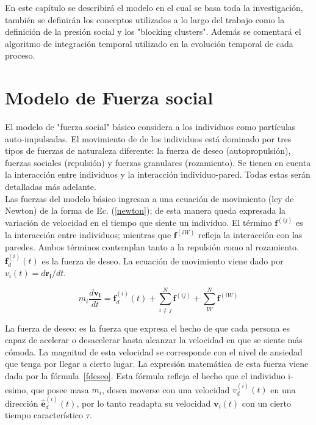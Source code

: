 \label{marco_teo}

En este capítulo se describirá el modelo en el cual se basa toda la investigación, también se definirán los conceptos utilizados a lo largo del trabajo como la definición de la presión social y los "blocking clusters". Además se comentará el algoritmo de integración temporal utilizado en la evolución temporal de cada proceso. 

\section{\label{sfm}Modelo de Fuerza social}

El modelo de "fuerza social" básico considera a los individuos como partículas auto-impulsadas. El movimiento de de los individuos está dominado por tres tipos de fuerzas de naturaleza diferente: la fuerza de deseo (autopropulsión), fuerzas sociales (repulsión) y fuerzas granulares (rozamiento). Se tienen en cuenta la interacción entre individuos y la interacción individuo-pared. Todas estas serán detalladas más adelante.   \\

Las fuerzas del modelo básico ingresan a una ecuación de movimiento (ley de Newton) de la forma de Ec. (\ref{newton}); de esta manera queda expresada la variación de velocidad en el tiempo que siente un individuo. El término $\mathbf{f}^{(ij)}$ es la interacción entre individuos; mientras que $\mathbf{f}^{(iW)}$ refleja la interacción con las paredes. Ambos términos contemplan tanto a la repulsión como al rozamiento. $\mathbf{f}_d^ {(i)}(t)$ es la fuerza de deseo. La ecuación de movimiento viene dado por $v_{i}(t)=d\mathbf{r_i}/dt$.

\begin{equation}
m_i\frac{d\mathbf{v_i}}{dt}=\mathbf{f}_d^ {(i)}(t)+ \sum_{i\neq j}^{N}\mathbf{f}^{(ij)} + \sum_{W}^{N}\mathbf{f}^{(iW)}
\label{newton}
\end{equation} 

La fuerza de deseo: es la fuerza que expresa el hecho de que cada persona es capaz de  acelerar o desacelerar hasta alcanzar la velocidad en que se siente más cómoda. La magnitud de esta velocidad se corresponde con el nivel de ansiedad que tenga por llegar a cierto lugar. La expresión matemática de esta fuerza viene dada por la fórmula~\ref{fdeseo}. Esta fórmula refleja el hecho que el individuo i-esimo, que posee masa $m_i$, desea  moverse con una velocidad $v_d^ {(i)}(t)$ en una dirección $\hat{\mathbf{e}}_d^ {(i)}(t)$, por lo tanto readapta su velocidad $\mathbf{v}_i(t)$ con un cierto tiempo característico $\tau$.


